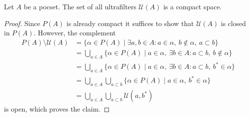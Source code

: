 

\begin{prop}
  Let \(A\) be a pocset. The set of all ultrafilters \(\mathcal{U}(A)\) is a compact space.
\end{prop}

\begin{proof}
  Since \(P(A)\) is already compact it suffices to show that \(\mathcal{U}(A)\) is closed in \(P(A)\). However, the complement
  \begin{align*}
    P(A) \setminus \mathcal{U}(A)
    & = \{\alpha \in P(A) \mid \exists a, b \in A\colon a \in \alpha,\ b \notin \alpha,\ a \subset b\}\\
    & = \bigcup_{a \in A} \{\alpha \in P(A) \mid a \in \alpha,\ \exists b \in A\colon a \subset b,\ b \notin \alpha\}\\
    & = \bigcup_{a \in A} \{\alpha \in P(A) \mid a \in \alpha,\ \exists b \in A\colon a \subset b,\ b^\ast \in \alpha\}\\
    & = \bigcup_{a \in A} \bigcup_{a \subset b}\{\alpha \in P(A) \mid a \in \alpha,\ b^\ast \in \alpha\}\\
    & = \bigcup_{a \in A} \bigcup_{a \subset b}\mathcal{U}(a, b^\ast)
  \end{align*}
  is open, which proves the claim.
\end{proof}

